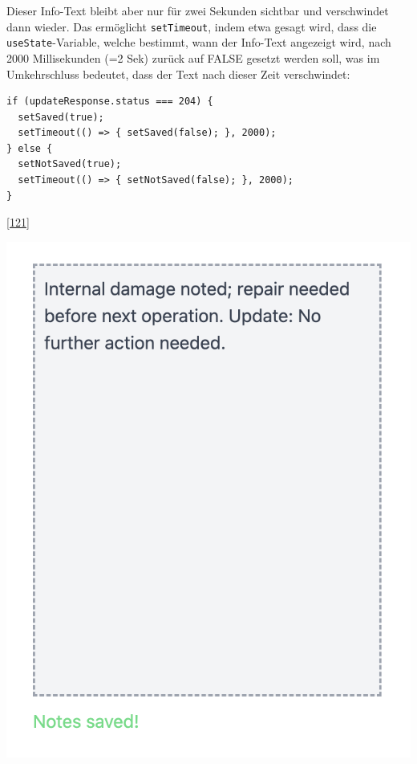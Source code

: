 \documentclass[
    headings=optiontotocandhead,%
    twoside,
    numbers=noenddot,%
    12pt, %
    titlepage, %
    parskip=full, %
    listof=leveldown, 
    numbers=noenddot, %
    a4paper,DIV=14,
    BCOR=15mm,
]{scrbook}
\newcommand{\passthrough}[1]{#1}
\let\origfigure=\figure
\let\endorigfigure=\endfigure
\renewenvironment{figure}[1][]{%
   \origfigure[H]
}{%
   \endorigfigure
}
\begin{document}
Dieser Info-Text bleibt aber nur für zwei Sekunden sichtbar und
verschwindet dann wieder. Das ermöglicht
\passthrough{\lstinline!setTimeout!}, indem etwa gesagt wird, dass die
\passthrough{\lstinline!useState!}-Variable, welche bestimmt, wann der
Info-Text angezeigt wird, nach 2000 Millisekunden (=2 Sek) zurück auf
FALSE gesetzt werden soll, was im Umkehrschluss bedeutet, dass der Text
nach dieser Zeit verschwindet:

\begin{lstlisting}[caption={Verwendung von setTimeout}]
if (updateResponse.status === 204) {
  setSaved(true);
  setTimeout(() => { setSaved(false); }, 2000);
} else {
  setNotSaved(true);
  setTimeout(() => { setNotSaved(false); }, 2000);
}
\end{lstlisting}

{[}\protect\hyperlink{ref-FreeCodeCamp-setTimeOut}{121}{]}

\begin{figure}
\centering
\includegraphics{img/Gekle/UpdatedNotes.png}
\caption{Notizen mit erfolgreicher Update-Benachrichtigung}
\end{figure}
\end{document}

